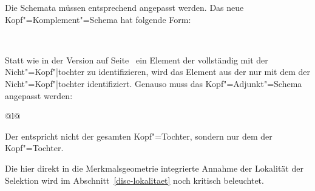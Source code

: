 \noindent
Die Schemata müssen entsprechend angepasst werden. Das neue Kopf"=Komplement"=Schema
hat folgende Form:
\begin{schema}
\label{schema-head-arg}
 \impl\\
\end{schema}
Statt wie in der Version auf Seite~\pageref{schema-bin-prel2} ein Element
der \compsl vollständig mit der Nicht"=Kopf"|tochter zu identifizieren, wird
das Element aus der \compsl nur mit dem \synsemw der Nicht"=Kopf"|tochter identifiziert.
Genauso muss das Kopf"=Adjunkt"=Schema angepasst werden:
\begin{schema}
\label{ha-schema-final}
\begin{tabular}[t]{@{}l@{}}
 \impl\\
\end{tabular}
\end{schema}
Der \modw entspricht nicht der gesamten Kopf"=Tochter, sondern nur dem \synsemw der Kopf"=Tochter.

Die hier direkt in die Merkmalsgeometrie integrierte Annahme der Lokalität der Selektion
wird im Abschnitt~\ref{disc-lokalitaet} noch kritisch beleuchtet.


